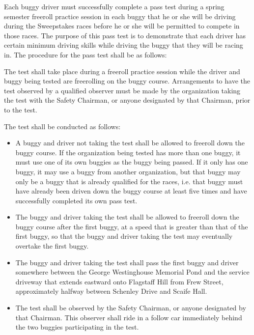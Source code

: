 	Each buggy driver must successfully complete a pass test during a spring
	semester freeroll practice session in each buggy that he or she will be driving
	during the Sweepstakes races before he or she will be permitted to compete in
	those races. The purpose of this pass test is to demonstrate that each driver
	has certain minimum driving skills while driving the buggy that they will be
	racing in. The procedure for the pass test shall be as follows:
	\newline

	The test shall take place during a freeroll practice session while the driver
	and buggy being tested are freerolling on the buggy course. Arrangements to
	have the test observed by a qualified observer must be made by the organization
	taking the test with the Safety Chairman, or anyone designated by that
	Chairman, prior to the test.
	\newline

	\noindent The test shall be conducted as follows:

	\begin{itemize}

		\item A buggy and driver not taking the test shall be allowed to freeroll
		down the buggy course. If the organization being tested has more than one
		buggy, it must use one of its own buggies as the buggy being passed. If it only
		has one buggy, it may use a buggy from another organization, but that buggy may
		only be a buggy that is already qualified for the races, i.e. that buggy must
		have already been driven down the buggy course at least five times and have
		successfully completed its own pass test.

		\item The buggy and driver taking the test shall be allowed to freeroll
		down the buggy course after the first buggy, at a speed that is greater than
		that of the first buggy, so that the buggy and driver taking the test may
		eventually overtake the first buggy.

		\item The buggy and driver taking the test shall pass the first buggy and
		driver somewhere between the George Westinghouse Memorial Pond and the service
		driveway that extends eastward onto Flagstaff Hill from Frew Street,
		approximately halfway between Schenley Drive and Scaife Hall.

		\item The test shall be observed by the Safety Chairman, or anyone
		designated by that Chairman. This observer shall ride in a follow car
		immediately behind the two buggies participating in the test.

	\end{itemize}

